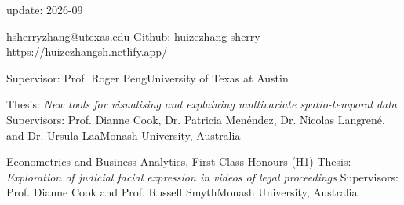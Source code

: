 \documentclass[10pt,a4paper]{article} %
\begin{document}
 


\hfill
update: 2026-09
\spacedhrule{0.2em}{-0.4em} %

\vspace{0.25cm}
\noindent
\href{mailto:hsherryzhang@utexas.edu}{hsherryzhang@utexas.edu}
\hspace{4em}
\href{https://github.com/huizezhang-sherry/}{Github: huizezhang-sherry}
\hfill
\href{https://huizezhangsh.netlify.app/}{https://huizezhangsh.netlify.app/}




    {Supervisor: Prof. Roger Peng}{University of Texas at Austin}

    {Thesis: \textit{New tools for visualising and explaining multivariate spatio-temporal data} \newline
    Supervisors: Prof. Dianne Cook, Dr. Patricia Men\'endez, Dr. Nicolas Langren\'e, and Dr. Ursula Laa}{Monash University, Australia}

    {Econometrics and Business Analytics, First Class Honours (H1) \newline
    Thesis: \textit{Exploration of judicial facial expression in videos of legal proceedings} \newline Supervisors: Prof. Dianne Cook and Prof. Russell Smyth}{Monash University, Australia}
\end{document}
